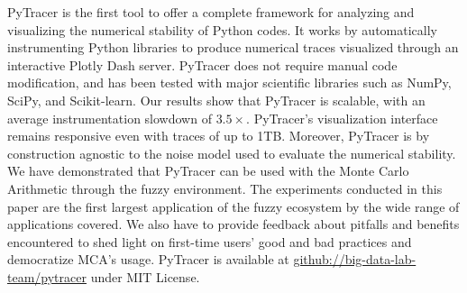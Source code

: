 \documentclass[11pt]{article}
\newcommand{\pytracer}[0]{PyTracer\xspace}
\begin{document}
\pytracer is the first tool to offer a complete framework
for analyzing and visualizing the numerical stability of Python codes.
It works by automatically instrumenting Python libraries to produce numerical
traces visualized through an interactive Plotly Dash server.
\pytracer does not require manual code modification, and has been tested  with 
major scientific libraries such as NumPy, SciPy, and Scikit-learn. Our results show that \pytracer is scalable, with an average instrumentation slowdown of $3.5\times$. \pytracer's visualization interface remains responsive even with traces of up to 1TB. Moreover,
\pytracer is by construction agnostic to the noise model used 
to evaluate the numerical stability. We have demonstrated 
that \pytracer can be used with the Monte Carlo Arithmetic 
through the fuzzy environment. 
The experiments conducted in this paper are the first largest application of the fuzzy ecosystem by the wide range of applications covered. 
We also have to provide feedback about pitfalls and benefits encountered to shed light on first-time users' good and bad practices and democratize MCA's usage. 
\pytracer is available at \href{https://github.com/big-data-lab-team/pytracer}{github://big-data-lab-team/pytracer} under MIT License.




\end{document}
